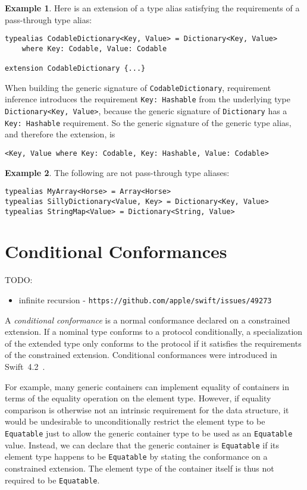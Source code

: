\documentclass[a4paper,headsepline,bibliography=totoc,toc=flat,fleqn,twoside=semi]{scrbook}
\theoremstyle{definition}
\theoremstyle{definition}
\newtheorem{example}{Example}[chapter]
\theoremstyle{definition}
\newcommand{\ifWIP}{\iffalse}
\begin{document}
\begin{example}
Here is an extension of a type alias satisfying the requirements of a pass-through type alias:
\begin{Verbatim}
typealias CodableDictionary<Key, Value> = Dictionary<Key, Value>
    where Key: Codable, Value: Codable

extension CodableDictionary {...}
\end{Verbatim}
When building the generic signature of \texttt{CodableDictionary}, requirement inference introduces the requirement \texttt{Key:\ Hashable} from the underlying type \texttt{Dictionary<Key, Value>}, because the generic signature of \texttt{Dictionary} has a \texttt{Key:\ Hashable} requirement. So the generic signature of the generic type alias, and therefore the extension, is
\begin{Verbatim}
<Key, Value where Key: Codable, Key: Hashable, Value: Codable>
\end{Verbatim}
\end{example}
\begin{example}
The following are not pass-through type aliases:
\begin{Verbatim}
typealias MyArray<Horse> = Array<Horse>
typealias SillyDictionary<Value, Key> = Dictionary<Key, Value>
typealias StringMap<Value> = Dictionary<String, Value>
\end{Verbatim}
\end{example}
\fi

\section{Conditional Conformances}\label{conditional conformance}

\ifWIP
TODO:
\begin{itemize}
\item infinite recursion - \texttt{https://github.com/apple/swift/issues/49273}
\end{itemize}

A \emph{conditional conformance} is a normal conformance declared on a constrained extension. If a nominal type conforms to a protocol conditionally, a specialization of the extended type only conforms to the protocol if it satisfies the requirements of the constrained extension. Conditional conformances were introduced in Swift~4.2~\cite{se0143}.

For example, many generic containers can implement equality of containers in terms of the equality operation on the element type. However, if equality comparison is otherwise not an intrinsic requirement for the data structure, it would be undesirable to unconditionally restrict the element type to be \texttt{Equatable} just to allow the generic container type to be used as an \texttt{Equatable} value. Instead, we can declare that the generic container is \texttt{Equatable} if its element type happens to be \texttt{Equatable} by stating the conformance on a constrained extension. The element type of the container itself is thus not required to be \texttt{Equatable}.
\end{document}
